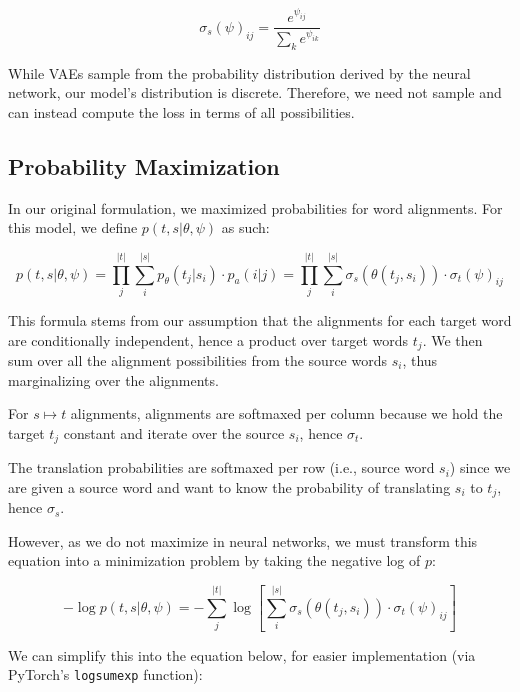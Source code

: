 \documentclass[twoside,twocolumn]{article}
\newlength\mystoreparindent
\newenvironment{myparindent}[1]{%
  \setlength{\mystoreparindent}{\the\parindent}
  \setlength{\parindent}{#1}
  }{%
  \setlength{\parindent}{\mystoreparindent}
}
\begin{document}
\begin{myparindent}{0pt}
\begin{equation}
  \sigma_s(\psi)_{ij} = \frac{e^{\psi_{ij}}}{\sum_{k} e^{\psi_{ik}}}
\end{equation}

While VAEs sample from the probability distribution derived by the neural
network, our model's distribution is discrete. Therefore, we need not
sample and can instead compute the loss in terms of all possibilities.

\subsection{Probability Maximization}

In our original formulation, we
maximized probabilities for word alignments.
For this model, we define $p(t, s | \theta, \psi)$ as such:

\begin{equation}
  p(t, s | \theta, \psi)
    = \prod_j^{|t|} \sum_i^{|s|} p_\theta(t_j| s_i) \cdot p_a(i|j)
    = \prod_j^{|t|} \sum_i^{|s|} \sigma_s(\theta(t_j, s_i)) \cdot \sigma_t(\psi)_{ij}
\end{equation}

This formula stems from our assumption that the alignments for each
target word are conditionally independent, hence a product over target
words $t_j$. We then sum over all the alignment possibilities from the source
words $s_i$, thus marginalizing over the alignments.

For $s \mapsto t$ alignments, alignments are softmaxed per column because
we hold the target $t_j$ constant and iterate
over the source $s_i$, hence $\sigma_t$.

The translation probabilities are softmaxed per row (i.e., source word $s_i$)
since we are given a source word and want to know the probability of
translating $s_i$ to $t_j$, hence $\sigma_s$.

However, as we do not maximize in neural networks, we must transform this
equation into a minimization problem by taking the negative log of $p$:

\begin{equation}
  -\log p(t, s | \theta, \psi) =
  - \sum_j^{|t|}
     \log \left[ \sum_i^{|s|} \sigma_s \left( \theta(t_j, s_i) \right) \cdot
      \sigma_t(\psi)_{ij} \right]
\end{equation}

We can simplify this into the equation below, for easier implementation
(via PyTorch's \texttt{logsumexp} function):


\end{myparindent}
\end{document}
